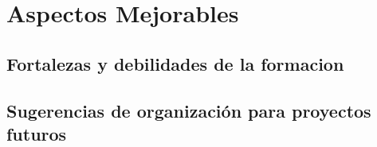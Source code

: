 \chapter{Aspectos Mejorables}

\section{Fortalezas y debilidades de la formacion} %

\section{Sugerencias de organizaci\'on para proyectos futuros} %
